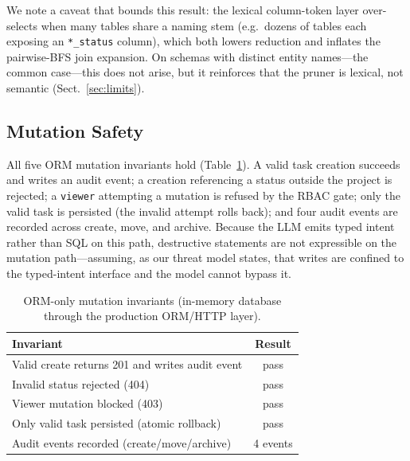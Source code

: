 \documentclass[runningheads]{llncs}
\begin{document}
We note a caveat that bounds this result: the lexical column-token layer over-selects when many tables share a naming stem (e.g.\ dozens of tables each exposing an \texttt{*\_status} column), which both lowers reduction and inflates the pairwise-BFS join expansion. On schemas with distinct entity names---the common case---this does not arise, but it reinforces that the pruner is lexical, not semantic (Sect.~\ref{sec:limits}).

\subsection{Mutation Safety}
All five ORM mutation invariants hold (Table~\ref{tab:mutation}). A valid task creation succeeds and writes an audit event; a creation referencing a status outside the project is rejected; a \texttt{viewer} attempting a mutation is refused by the RBAC gate; only the valid task is persisted (the invalid attempt rolls back); and four audit events are recorded across create, move, and archive. Because the LLM emits typed intent rather than SQL on this path, destructive statements are not expressible on the mutation path---assuming, as our threat model states, that writes are confined to the typed-intent interface and the model cannot bypass it.

\begin{table}[htbp]
\centering
\caption{ORM-only mutation invariants (in-memory database through the production ORM/HTTP layer).}
\label{tab:mutation}
\begin{tabular}{lc}
\toprule
\textbf{Invariant} & \textbf{Result} \\
\midrule
Valid create returns 201 and writes audit event & pass \\
Invalid status rejected (404) & pass \\
Viewer mutation blocked (403) & pass \\
Only valid task persisted (atomic rollback) & pass \\
Audit events recorded (create/move/archive) & 4 events \\
\bottomrule
\end{tabular}
\end{table}
\end{document}
